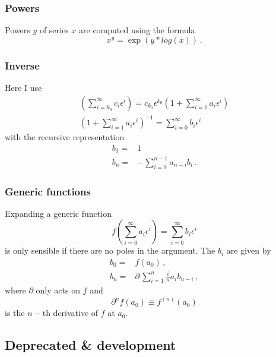 \documentclass{article}
\begin{document}
\subsubsection{Powers}
\label{sec:impl_pow}

Powers $y$ of series $x$ are computed using the formula
\begin{equation}
  \label{eq:pow}
  x^y=\exp(y*log(x))\,.
\end{equation}


\subsubsection{Inverse}
\label{sec:impl_inverse}

Here I use
\begin{align}
  \label{eq:inv}
  \left(\sum_{i=k_0}^{\infty}c_i
    \epsilon^i\right)=c_{k_0}\epsilon^{k_0}\left(1+\sum_{i=1}^{\infty}a_i
    \epsilon^i\right)\\
\left(1+\sum_{i=1}^{\infty}a_i \epsilon^i\right)^{-1}=\sum_{i=0}^{\infty}b_i \epsilon^i
\end{align}
with the recursive representation
\begin{align}
  \label{eq:inv_rec}
  b_0=&1\\
  b_n=&-\sum_{i=0}^{n-1} a_{n-i}b_i \,.
\end{align}

\subsubsection{Generic functions}
\label{sec:generic_fun}

Expanding a generic function
\begin{equation}
  \label{eq:generic_fun}
  f\left(\sum_{i=0}^{\infty}a_i
    \epsilon^i\right)=\sum_{i=0}^{\infty}b_i
    \epsilon^i
\end{equation}
is only sensible if there are no poles in the argument.
The $b_i$ are given by
\begin{align}
  \label{eq:generic_rec}
  b_0=&f(a_0)\,,\\
  b_n=&\partial\,\sum_{i=1}^{n}\frac{i}{n} a_{i}b_{n-i} \,,
\end{align}
where $\partial$ only acts on $f$ and
\begin{equation}
  \label{eq:partial}
  \partial^n f(a_0) \equiv f^{(n)}(a_0) 
\end{equation}
is the $n-$th derivative of $f$ at $a_0$. 

\subsection{Deprecated \& development}
\label{sec:depr}
\end{document}
